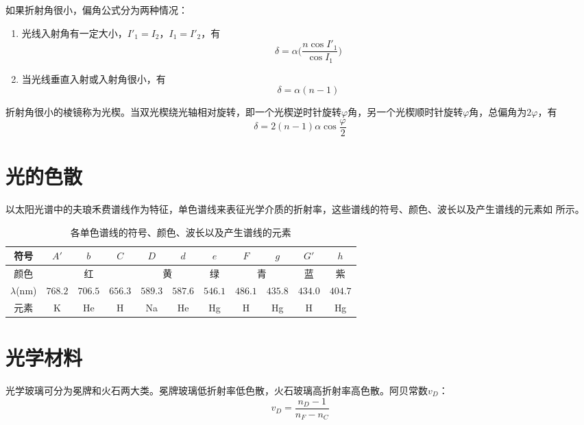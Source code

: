 \documentclass[cn,10pt,chinesefont=founder,math=newtx,cite=super,twoside]{elegantbook}
\begin{document}
如果折射角很小，偏角公式分为两种情况：
\begin{enumerate}
	\item 光线入射角有一定大小，$I'_1=I_2$，$I_1=I'_2$，有
	\begin{equation}
	\delta=\alpha\bigg(\frac{n\cos I'_1}{\cos I_1}\bigg)
	\end{equation}
	\item 当光线垂直入射或入射角很小，有
	\begin{equation}
	\delta=\alpha(n-1)
	\end{equation}
\end{enumerate}

折射角很小的棱镜称为光楔。当双光楔绕光轴相对旋转，即一个光楔逆时针旋转$\varphi$角，另一个光楔顺时针旋转$\varphi$角，总偏角为$2\varphi$，有
\begin{equation}
\delta=2(n-1)\alpha\cos\frac{\varphi}{2}
\end{equation}

\section{光的色散}
以太阳光谱中的夫琅禾费谱线作为特征，单色谱线来表征光学介质的折射率，这些谱线的符号、颜色、波长以及产生谱线的元素如 所示。

\begin{table}[htbp]
	\small
	\centering
	\caption{各单色谱线的符号、颜色、波长以及产生谱线的元素}
	\begin{tabular}{c|c|c|c|c|c|c|c|c|c|c}
		\hline
		符号&$A'$&$b$&$C$&$D$&$d$&$e$&$F$&$g$&$G'$&$h$\\
		\hline
		颜色&\multicolumn{3}{c|}{红}&\multicolumn{2}{c|}{黄}&绿&\multicolumn{2}{c|}{青}&蓝&紫\\
		\hline
		$\lambda$(nm)&$768.2$&$706.5$&$656.3$&$589.3$&$587.6$&$546.1$&$486.1$&$435.8$&$434.0$&$404.7$\\
		\hline
		元素&K&He&H&Na&He&Hg&H&Hg&H&Hg\\
		\hline
	\end{tabular}
	\label{tab:spectral-line}
\end{table}

\section{光学材料}
\label{sect:optical-material}
光学玻璃可分为冕牌和火石两大类。冕牌玻璃低折射率低色散，火石玻璃高折射率高色散。阿贝常数$v_D$：
\begin{equation}
v_D=\frac{n_D-1}{n_F-n_C}
\end{equation}
\end{document}

